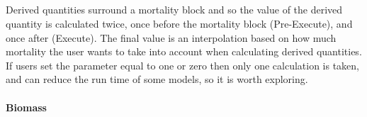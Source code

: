 \begin{figure}[htp]%
	\centering
	\qquad
	\label{fig:static_pref}%
\end{figure}




\subsection{\label{sec:derived-quantities}}
Derived quantities surround a mortality block and so the value of the derived quantity is calculated twice, once before the mortality block (Pre-Execute), and once after (Execute). The final value is an interpolation based on how much mortality the user wants to take into account when calculating derived quantities. If users set the  parameter equal to one or zero then only one calculation is taken, and can reduce the run time of some models, so it is worth exploring.
\paragraph*{Biomass}\label{para:biomass}

